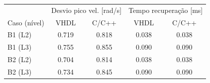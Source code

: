 \begin{tabular}{lcccc}
\toprule
 & \multicolumn{2}{c}{Desvio pico vel. [rad/s]} & \multicolumn{2}{c}{Tempo recuperação [ms]} \\
Caso (nível) & VHDL & C/C++ & VHDL & C/C++ \\
\midrule
B1 (L2) & 0.719 & 0.818 & 0.038 & 0.038 \\
B1 (L3) & 0.755 & 0.855 & 0.090 & 0.090 \\
B2 (L2) & 0.704 & 0.814 & 0.038 & 0.038 \\
B2 (L3) & 0.734 & 0.845 & 0.090 & 0.090 \\
\bottomrule
\end{tabular}
